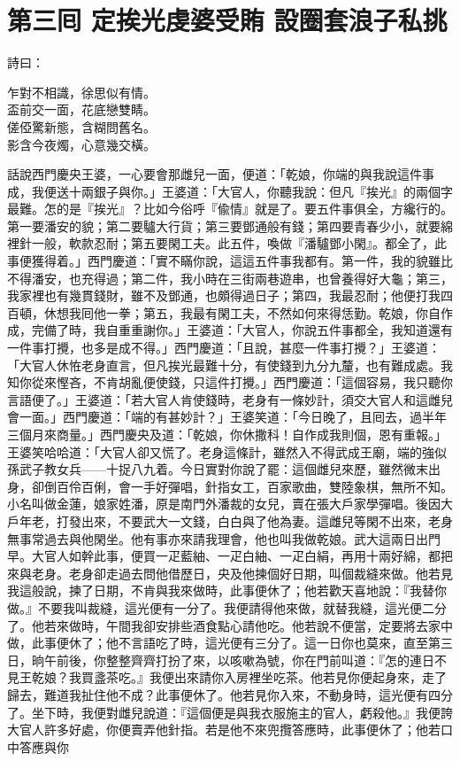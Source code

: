 
\chapter*{第三囘 定挨光虔婆受賄 設圈套浪子私挑}


詩曰：

\begin{myquote} 
乍對不相識，徐思似有情。\\盃前交一面，花底戀雙睛。\\傞俹驚新態，含糊問舊名。\\影含今夜燭，心意幾交橫。
\end{myquote} 

話說西門慶央王婆，一心要會那雌兒一面，便道：「乾娘，你端的與我說這件事成，我便送十兩銀子與你。」王婆道：「大官人，你聽我說：但凡『挨光』的兩個字最難。怎的是『挨光』？比如今俗呼『偸情』就是了。要五件事俱全，方纔行的。第一要潘安的貌；第二要驢大行貨；第三要鄧通般有錢；第四要青春少小，就要綿裡針一般，軟款忍耐；第五要閑工夫。此五件，喚做『潘驢鄧小閑』。都全了，此事便獲得着。」西門慶道：「實不瞞你說，這這五件事我都有。第一件，我的貌雖比不得潘安，也充得過；第二件，我小時在三街兩巷遊串，也曾養得好大龜；第三，我家裡也有幾貫錢財，雖不及鄧通，也頗得過日子；第四，我最忍耐；他便打我四百頓，休想我囘他一拳；第五，我最有閑工夫，不然如何來得恁勤。乾娘，你自作成，完備了時，我自重重謝你。」王婆道：「大官人，你說五件事都全，我知道還有一件事打攪，也多是成不得。」西門慶道：「且說，甚麼一件事打攪？」王婆道：「大官人休恠老身直言，但凡挨光最難十分，有使錢到九分九釐，也有難成處。我知你從來慳吝，不肯胡亂便使錢，只這件打攪。」西門慶道：「這個容易，我只聽你言語便了。」王婆道：「若大官人肯使錢時，老身有一條妙計，須交大官人和這雌兒會一面。」西門慶道：「端的有甚妙計？」王婆笑道：「今日晚了，且囘去，過半年三個月來商量。」西門慶央及道：「乾娘，你休撒科！自作成我則個，恩有重報。」王婆笑哈哈道：「大官人卻又慌了。老身這條計，雖然入不得武成王廟，端的強似孫武子教女兵——十捉八九着。今日實對你說了罷：這個雌兒來歷，雖然微末出身，卻倒百伶百俐，會一手好彈唱，針指女工，百家歌曲，雙陸象棋，無所不知。小名叫做金蓮，娘家姓潘，原是南門外潘裁的女兒，賣在張大戶家學彈唱。後因大戶年老，打發出來，不要武大一文錢，白白與了他為妻。這雌兒等閑不出來，老身無事常過去與他閑坐。他有事亦來請我理會，他也叫我做乾娘。武大這兩日出門早。大官人如幹此事，便買一疋藍紬、一疋白紬、一疋白絹，再用十兩好綿，都把來與老身。老身卻走過去問他借歷日，央及他揀個好日期，叫個裁縫來做。他若見我這般說，揀了日期，不肯與我來做時，此事便休了；他若歡天喜地說：『我替你做。』不要我叫裁縫，這光便有一分了。{}我便請得他來做，就替我縫，這光便二分了。他若來做時，午間我卻安排些酒食點心請他吃。他若說不便當，定要將去家中做，此事便休了；他不言語吃了時，這光便有三分了。這一日你也莫來，直至第三日，晌午前後，你整整齊齊打扮了來，以咳嗽為號，你在門前叫道：『怎的連日不見王乾娘？我買盞茶吃。』我便出來請你入房裡坐吃茶。他若見你便起身來，走了歸去，難道我扯住他不成？此事便休了。他若見你入來，不動身時，這光便有四分了。坐下時，我便對雌兒說道：『這個便是與我衣服施主的官人，虧殺他。』我便誇大官人許多好處，你便賣弄他針指。若是他不來兜攬答應時，此事便休了；他若口中答應與你